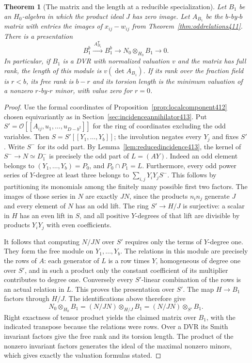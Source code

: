 \documentclass[a4paper,11pt]{article}
\newtheorem{theorem}[proposition]{Theorem}
\theoremstyle{definition}
\theoremstyle{remark}
\numberwithin{equation}{section}
\begin{document}
\begin{theorem}[The matrix and the length at a reducible specialization]\leavevmode
\label{thm:cornermatrix414}
Let \(B_1\) be an \(H_0\)-algebra in which the product
ideal \(J\) has zero image. Let \(A_{B_1}\) be the
\(b\)-by-\(b\) matrix with entries the images of
\(x_{ij}-w_{ij}\) from Theorem~\ref{thm:oddrelations411}.
There is a presentation
\[
 B_1^b \xrightarrow{\ A_{B_1}^{\mathsf T}\ } B_1^b
     \longrightarrow N_0\otimes_{H_0} B_1\longrightarrow 0 .
\]
In particular, if \(B_1\) is a DVR with normalized valuation
\(v\) and the matrix has full rank, the length of this
module is \(v(\det A_{B_1})\). If its rank over the
fraction field is \(r<b\), its free rank is \(b-r\) and
its torsion length is the minimum valuation of a nonzero
\(r\)-by-\(r\) minor, with value zero for \(r=0\).
\end{theorem}
\begin{proof}
Use the formal coordinates of Proposition~\ref{prop:localcomponent412}
chosen equivariantly as in Section~\ref{sec:incidenceannihilator413}.
Put \(S'=\mathcal O[[A_{ij},u_1,\ldots,u_{D-b^2}]]\)
for the ring of coordinates excluding the odd variables.
Then \(S=S'[[Y_1,\ldots,Y_b]]\); the involution negates
every \(Y_j\) and fixes \(S'\). Write \(S^-\) for its odd
part. By Lemma~\ref{lem:reducedincidence413}, the kernel
of \(S^-\to N\simeq D_1^-\) is precisely the odd part
of \(L=(AY)\). Indeed an odd element belongs to
\((Y_1,\ldots,Y_b)=P_0\), and \(P_0\cap P_1=L\).
Furthermore, every odd power series of \(Y\)-degree at
least three belongs to \(\sum_{i,j}Y_iY_j S^-\). This
follows by partitioning its monomials among the finitely
many possible first two factors. The images of those
series in \(N\) are exactly \(JN\), since the products
\(n_i n_j\) generate \(J\) and every element of \(N\)
has an odd lift. The ring \(S'\to H/J\) is surjective:
a scalar in \(H\) has an even lift in \(S\), and all positive
\(Y\)-degrees of that lift are divisible by products
\(Y_iY_j\) with even coefficients.

It follows that computing \(N/JN\) over \(S'\) requires
only the terms of \(Y\)-degree one. They form the free
module on \(Y_1,\ldots,Y_b\). The relations in this module
are precisely the rows of \(A\): each generator of \(L\)
is a row times \(Y\), homogeneous of degree one over
\(S'\), and in such a product only the constant coefficient
of its multiplier contributes to degree one. Conversely
every \(S'\)-linear combination of the rows is an actual
relation in \(L\). This proves the presentation over
\(S'\). The map \(H\to B_1\) factors through \(H/J\).
The identifications above therefore give
\[
 N_0\otimes_{H_0}B_1=(N/JN)\otimes_{H/J}B_1
                   =(N/JN)\otimes_{S'}B_1 .
\]
Right exactness of tensor product yields the claimed matrix
over \(B_1\), with the indicated transpose because the
relations were rows. Over a DVR its Smith invariant factors
give the free rank and its torsion length. The product of
the nonzero invariant factors generates the ideal of the
maximal nonzero minors, which gives exactly the valuation
formulas stated.
\end{proof}
\end{document}
